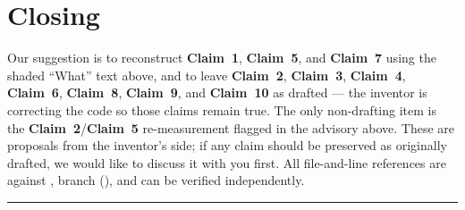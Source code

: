 \documentclass[12pt,a4paper]{article}
\newcommand{\clm}[1]{\textbf{Claim~#1}}
\begin{document}
\section{Closing}

Our suggestion is to reconstruct \clm{1}, \clm{5}, and \clm{7} using the shaded ``What'' text
above, and to leave \clm{2}, \clm{3}, \clm{4}, \clm{6}, \clm{8}, \clm{9}, and \clm{10} as
drafted --- the inventor is correcting the code so those claims remain true. The
only non-drafting item is the \clm{2}/\clm{5} re-measurement flagged in the advisory above.
These are proposals from the inventor's side; if any claim should be preserved as originally
drafted, we would like to discuss it with you first. All file-and-line references are against
, branch 
(\href{https://github.com/Manikanta25055/Garuda_26}{}),
and can be verified independently.

\vspace{0.8cm}
\noindent\rule{\textwidth}{0.4pt}
\vspace{0.2cm}

\end{document}
